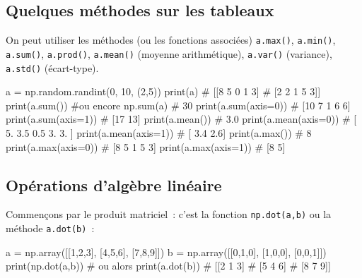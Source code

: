 \documentclass[10pt,fleqn]{article} %
\begin{document}
\subsection{Quelques méthodes sur les tableaux}
On peut utiliser les méthodes (ou les fonctions associées)
\texttt{a.max()}, 
\texttt{a.min()}, 
\texttt{a.sum()}, 
\texttt{a.prod()}, 
\texttt{a.mean()} (moyenne arithmétique), 
\texttt{a.var()} (variance), 
\texttt{a.std()} (écart-type).

\begin{py}
\begin{multicols}{3}
\begin{python}
a = np.random.randint(0, 10, (2,5))
print(a)
# [[8 5 0 1 3]
#  [2 2 1 5 3]]
print(a.sum()) #ou encore np.sum(a)
# 30
print(a.sum(axis=0))
# [10  7  1  6  6]
print(a.sum(axis=1))
# [17 13]
print(a.mean())
# 3.0
print(a.mean(axis=0))
# [ 5.   3.5  0.5  3.   3. ]
print(a.mean(axis=1))
# [ 3.4  2.6]
print(a.max())
# 8
print(a.max(axis=0))
# [8 5 1 5 3]
print(a.max(axis=1))
# [8 5]  
\end{python}
\end{multicols}
\end{py}

\subsection{Opérations d'algèbre linéaire}

Commençons par le produit matriciel~: c'est la fonction
\texttt{np.dot(a,b)} ou la méthode \texttt{a.dot(b)}~:

\begin{py}
\begin{multicols}{3}
\begin{python}
a = np.array([[1,2,3],
              [4,5,6],
              [7,8,9]])
b = np.array([[0,1,0],
              [1,0,0],
              [0,0,1]])
print(np.dot(a,b)) 
# ou alors print(a.dot(b))  
# [[2 1 3]
#  [5 4 6]
#  [8 7 9]]
\end{python}
\end{multicols}
\end{py}
\end{document}
